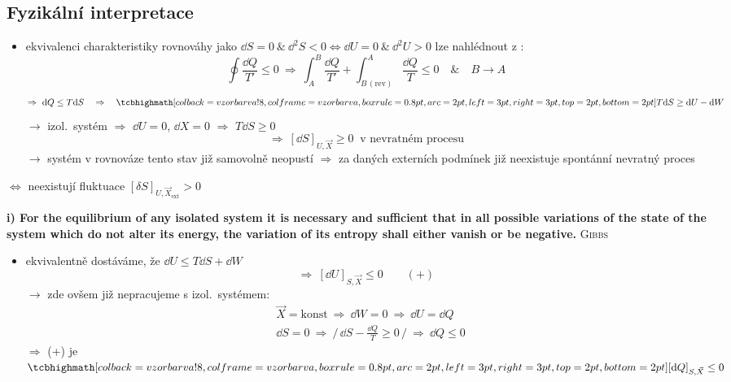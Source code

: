 \subsection*{Fyzikální interpretace}
\begin{itemize}
  \item ekvivalenci charakteristiky rovnováhy jako $\dd S = 0\ \&\ \dd^2S < 0 \Leftrightarrow \dd U = 0\ \&\ \dd^2U > 0$ lze nahlédnout z :
  \[
    \oint\frac{\dd Q}{T'} \leq 0 \ \Rightarrow\ \int_A^B\frac{\dd Q}{T'} + \int_{B\,(\text{rev})}^{A}\frac{\dd Q}{T} \leq 0 \quad\&\quad B\to A
  \]
  \[
    \Rightarrow\ \dd Q \leq T\dd S \quad\Rightarrow\quad \vzorec{T\dd S \geq \dd U - \dd W}
  \]
  $\to$ izol.\ systém $\Rightarrow$ $\dd U = 0$, $\dd X = 0$ $\Rightarrow$ $T\dd S \geq 0$
  \[
    \Rightarrow\ \boxed{[\dd S]_{U,\vec X} \geq 0 \ \text{ v nevratném procesu}}
  \]
  $\to$ systém v rovnováze tento stav již samovolně neopustí $\Rightarrow$ za daných externích podmínek již neexistuje spontánní nevratný proces
\end{itemize}

\begin{veta}
$\Leftrightarrow$ neexistují fluktuace $[\delta S]_{U,\vec X_{\text{ext}}} > 0$

\smallskip
\textbf{\small i) For the equilibrium of any isolated system it is necessary and sufficient that in all possible variations of the state of the system which do not alter its energy, the variation of its entropy shall either vanish or be negative.} \hfill \textsc{Gibbs}
\end{veta}

\begin{itemize}
  \item ekvivalentně dostáváme, že $\dd U \leq T\dd S + \dd W$
  \[
    \Rightarrow\ [\dd U]_{S,\vec X} \leq 0 \qquad (+)
  \]
  $\to$ zde ovšem již nepracujeme s izol.\ systémem:
  \[
    \begin{aligned}
      &\vec X = \text{konst} \ \Rightarrow\ \dd W = 0 \ \Rightarrow\ \dd U = \dd Q \\
      &\dd S = 0 \ \Rightarrow\ \Big/\,\dd S - \frac{\dd Q}{T}\geq 0\,\Big/ \ \Rightarrow\ \dd Q \leq 0
    \end{aligned}
  \]
  $\Rightarrow$ (+) je \quad $\vzorec{[\dd Q]_{S,\vec X} \leq 0}$
\end{itemize}

